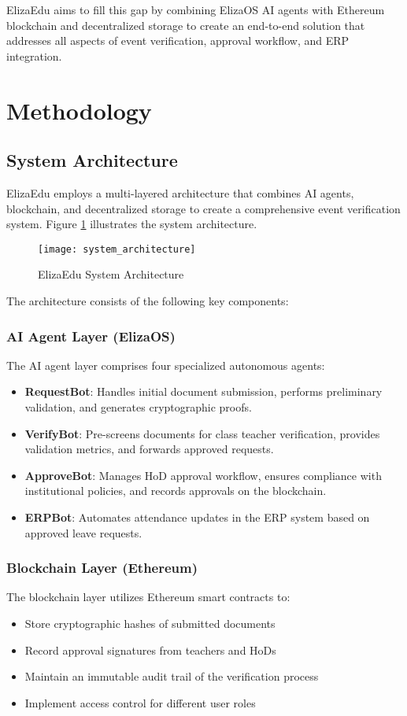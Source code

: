 \documentclass[a4paper,12pt]{article}
\begin{document}
ElizaEdu aims to fill this gap by combining ElizaOS AI agents with Ethereum blockchain and decentralized storage to create an end-to-end solution that addresses all aspects of event verification, approval workflow, and ERP integration.

\section{Methodology}
\subsection{System Architecture}
ElizaEdu employs a multi-layered architecture that combines AI agents, blockchain, and decentralized storage to create a comprehensive event verification system. Figure \ref{fig:architecture} illustrates the system architecture.

\begin{figure}[H]
\centering
\texttt{[image: system\_architecture]}
\caption{ElizaEdu System Architecture}
\label{fig:architecture}
\end{figure}

The architecture consists of the following key components:

\subsubsection{AI Agent Layer (ElizaOS)}
The AI agent layer comprises four specialized autonomous agents:
\begin{itemize}
    \item \textbf{RequestBot}: Handles initial document submission, performs preliminary validation, and generates cryptographic proofs.
    \item \textbf{VerifyBot}: Pre-screens documents for class teacher verification, provides validation metrics, and forwards approved requests.
    \item \textbf{ApproveBot}: Manages HoD approval workflow, ensures compliance with institutional policies, and records approvals on the blockchain.
    \item \textbf{ERPBot}: Automates attendance updates in the ERP system based on approved leave requests.
\end{itemize}

\subsubsection{Blockchain Layer (Ethereum)}
The blockchain layer utilizes Ethereum smart contracts to:
\begin{itemize}
    \item Store cryptographic hashes of submitted documents
    \item Record approval signatures from teachers and HoDs
    \item Maintain an immutable audit trail of the verification process
    \item Implement access control for different user roles
\end{itemize}
\end{document}
